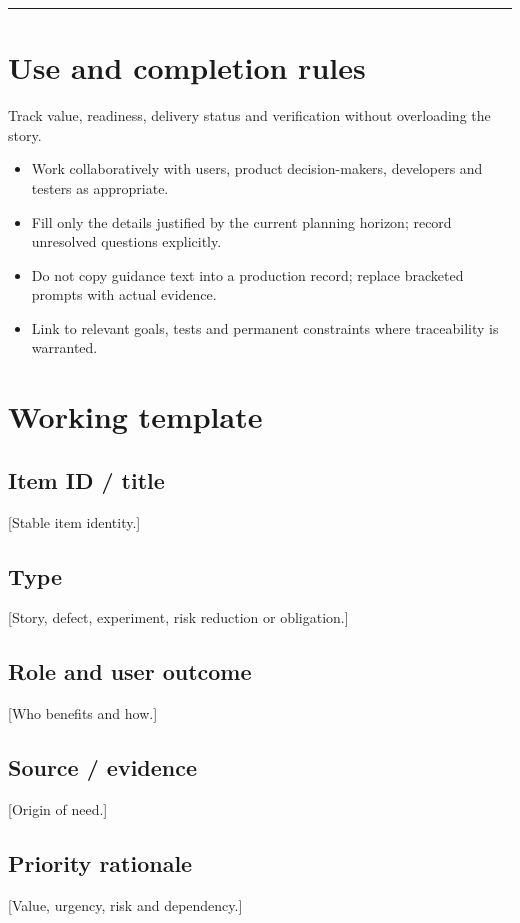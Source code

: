 \documentclass[11pt,letterpaper]{article}
\begin{document}
\tableofcontents\medskip\noindent\rule{\linewidth}{0.4pt}\medskip
\section{Use and completion rules}
Track value, readiness, delivery status and verification without overloading the story.

\begin{itemize}[leftmargin=*,itemsep=2pt]
\item Work collaboratively with users, product decision-makers, developers and testers as appropriate.
\item Fill only the details justified by the current planning horizon; record unresolved questions explicitly.
\item Do not copy guidance text into a production record; replace bracketed prompts with actual evidence.
\item Link to relevant goals, tests and permanent constraints where traceability is warranted.
\end{itemize}
\section{Working template}
\subsection{Item ID / title}
[Stable item identity.]

\subsection{Type}
[Story, defect, experiment, risk reduction or obligation.]

\subsection{Role and user outcome}
[Who benefits and how.]

\subsection{Source / evidence}
[Origin of need.]

\subsection{Priority rationale}
[Value, urgency, risk and dependency.]
\end{document}
